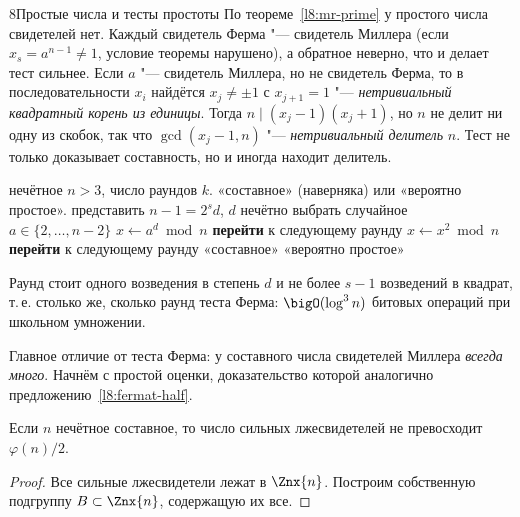 \begin{lecture}{8}{Простые числа и тесты простоты}
По теореме~\ref{l8:mr-prime} у простого числа свидетелей нет. Каждый свидетель Ферма "---
свидетель Миллера (если $x_s = a^{n-1} \ne 1$, условие теоремы нарушено), а обратное неверно,
что и делает тест сильнее. Если $a$ "--- свидетель Миллера, но не свидетель Ферма, то
в последовательности $x_i$ найдётся $x_j \ne \pm 1$ с $x_{j+1} = 1$ "--- \emph{нетривиальный
квадратный корень из единицы}. Тогда $n \mid (x_j - 1)(x_j + 1)$, но $n$ не делит ни одну из
скобок, так что $\gcd(x_j - 1, n)$ "--- \emph{нетривиальный делитель} $n$. Тест не только
доказывает составность, но и иногда находит делитель.

\begin{algorithm}\label{l8:alg-mr}
\begin{algorithmic}[1]
\Require нечётное $n > 3$, число раундов $k$.
\Ensure «составное» (наверняка) или «вероятно простое».
\State представить $n - 1 = 2^s d$, $d$ нечётно
  \State выбрать случайное $a \in \{2, \ldots, n - 2\}$
  \State $x \gets a^d \bmod n$
   \textbf{перейти} к следующему раунду \EndIf
    \State $x \gets x^2 \bmod n$
     \textbf{перейти} к следующему раунду \EndIf
  \EndFor
  \State \Return «составное» 
\EndFor
\State \Return «вероятно простое»
\end{algorithmic}
\end{algorithm}

Раунд стоит одного возведения в степень $d$ и не более $s - 1$ возведений в квадрат, т.\,е.
столько же, сколько раунд теста Ферма: $\bigO(\log^3 n)$ битовых операций при школьном
умножении.



Главное отличие от теста Ферма: у составного числа свидетелей Миллера \emph{всегда много}.
Начнём с простой оценки, доказательство которой аналогично предложению~\ref{l8:fermat-half}.

\begin{theorem}\label{l8:mr-half}
Если $n$ нечётное составное, то число сильных лжесвидетелей не превосходит $\varphi(n)/2$.
\end{theorem}

\begin{proof}
Все сильные лжесвидетели лежат в $\Znx{n}$. Построим собственную подгруппу $B \subset \Znx{n}$,
содержащую их все.


\end{proof}
\end{lecture}
